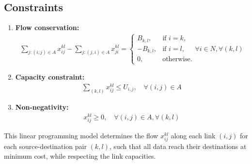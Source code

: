 \documentclass{article}
\begin{document}
\subsection*{Constraints}
\begin{enumerate}
    \item \textbf{Flow conservation:} 
    \begin{align*}
        \sum_{j:(i,j) \in A} x_{ij}^{kl} - \sum_{j:(j,i) \in A} x_{ji}^{kl} = 
        \begin{cases} 
        B_{k,l}, & \text{if } i = k, \\
        -B_{k,l}, & \text{if } i = l, \\
        0, & \text{otherwise}.
        \end{cases} \forall i \in N, \forall (k,l)
    \end{align*}
    
    \item \textbf{Capacity constraint:}
    \begin{align*}
        \sum_{(k,l)} x_{ij}^{kl} \leq U_{i,j}, \quad \forall (i,j) \in A
    \end{align*}
    
    \item \textbf{Non-negativity:}
    \begin{align*}
        x_{ij}^{kl} \geq 0, \quad \forall (i,j) \in A, \forall (k,l)
    \end{align*}
\end{enumerate}

This linear programming model determines the flow $x_{ij}^{kl}$ along each link $(i, j)$ for each source-destination pair $(k, l)$, such that all data reach their destinations at minimum cost, while respecting the link capacities.
\end{document}
